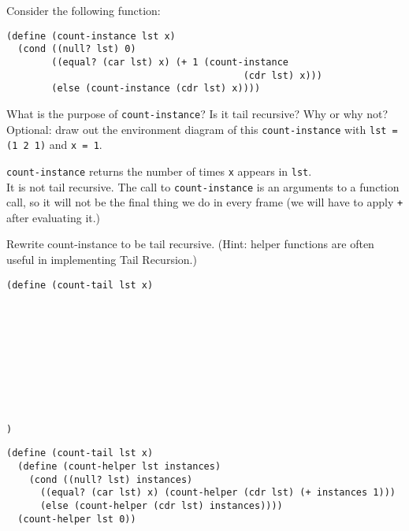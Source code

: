 \begin{blocksection}
\question Consider the following function:

\begin{lstlisting}
(define (count-instance lst x)
  (cond ((null? lst) 0)
        ((equal? (car lst) x) (+ 1 (count-instance
                                          (cdr lst) x)))
        (else (count-instance (cdr lst) x))))
\end{lstlisting}

\vspace{2\baselineskip}

What is the purpose of \texttt{count-instance}? Is it tail recursive? Why or why not?
\newline
Optional: draw out the environment diagram of this \texttt{count-instance} with \texttt{lst = (1 2 1)} and \texttt{x = 1}.

\begin{solution}[0.5in]
\texttt{count-instance} returns the number of times \texttt{x} appears in \texttt{lst}.
\\It is not tail recursive. The call to \texttt{count-instance} is an arguments to a function call, so it will not be the final thing we do in every frame (we will have to apply \texttt{+} after evaluating it.)
\end{solution}


\question Rewrite count-instance to be tail recursive. (Hint: helper functions are often useful in implementing Tail Recursion.)

\begin{lstlisting}
(define (count-tail lst x)










)
\end{lstlisting}

\begin{solution}[0.5in]
\begin{lstlisting}
(define (count-tail lst x)
  (define (count-helper lst instances)
    (cond ((null? lst) instances)
      ((equal? (car lst) x) (count-helper (cdr lst) (+ instances 1)))
      (else (count-helper (cdr lst) instances))))
  (count-helper lst 0))
\end{lstlisting}
\end{solution}
\end{blocksection}

